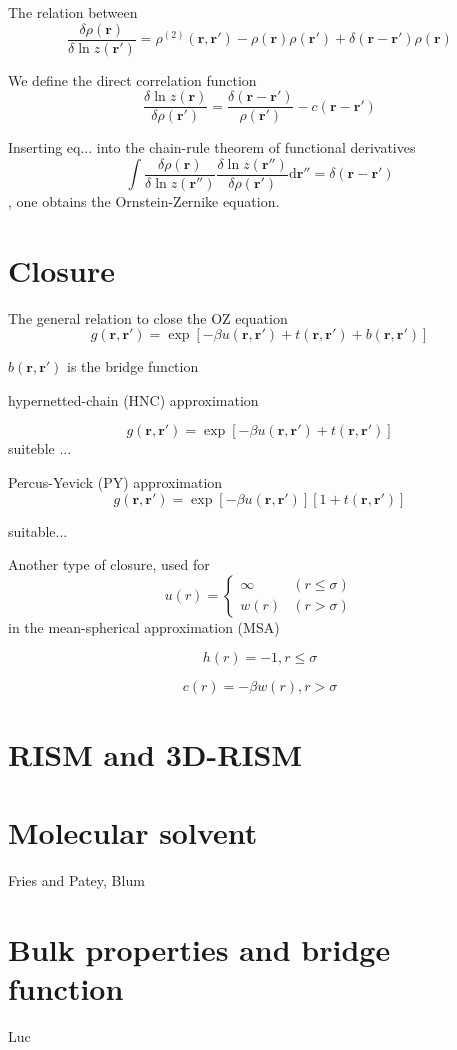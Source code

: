 The relation between
\[
\frac{\delta\rho(\mathbf{r})}{\delta\ln z(\mathbf{r}')}=\rho^{(2)}(\mathbf{r},\mathbf{r}')-\rho(\mathbf{r})\rho(\mathbf{r}')+\delta(\mathbf{r}-\mathbf{r}')\rho(\mathbf{r})
\]


We define the direct correlation function
\[
\frac{\delta\ln z(\mathbf{r})}{\delta\rho(\mathbf{r}')}=\frac{\delta(\mathbf{r}-\mathbf{r}')}{\rho(\mathbf{r}')}-c(\mathbf{r}-\mathbf{r}')
\]


Inserting eq... into the chain-rule theorem of functional derivatives
\[
\int\frac{\delta\rho(\mathbf{r})}{\delta\ln z(\mathbf{r}'')}\frac{\delta\ln z(\mathbf{r}'')}{\delta\rho(\mathbf{r}')}\mathrm{d}\mathbf{r}''=\delta(\mathbf{r}-\mathbf{r}')
\],
one obtains the Ornstein-Zernike equation.


\section{Closure}

The general relation to close the OZ equation
\begin{equation}
g(\mathbf{r},\mathbf{r}')=\exp\left[-\beta u(\mathbf{r},\mathbf{r}')+t(\mathbf{r},\mathbf{r}')+b(\mathbf{r},\mathbf{r}')\right]
\end{equation}


$b(\mathbf{r},\mathbf{r}')$ is the bridge function

hypernetted-chain (HNC) approximation

\begin{equation}
g(\mathbf{r},\mathbf{r}')=\exp\left[-\beta u(\mathbf{r},\mathbf{r}')+t(\mathbf{r},\mathbf{r}')\right]
\end{equation}
suiteble ...

Percus-Yevick (PY) approximation
\begin{equation}
g(\mathbf{r},\mathbf{r}')=\exp\left[-\beta u(\mathbf{r},\mathbf{r}')\right]\left[1+t(\mathbf{r},\mathbf{r}')\right]
\end{equation}


suitable...

Another type of closure, used for 
\[
u(r)=\begin{cases}
\infty & (r\leq\sigma)\\
w(r) & (r>\sigma)
\end{cases}
\]
in the mean-spherical approximation (MSA)

\[
h(r)=-1,r\leq\sigma
\]


\[
c(r)=-\beta w(r),r>\sigma
\]



\section{RISM and 3D-RISM}


\section{Molecular solvent}

Fries and Patey, Blum


\section{Bulk properties and bridge function}

Luc
